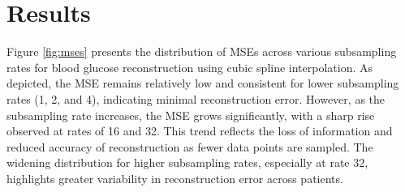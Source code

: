 
\section{Results}
Figure \ref{fig:mses} presents the distribution of MSEs across various subsampling rates for blood glucose reconstruction using cubic spline interpolation. As depicted, the MSE remains relatively low and consistent for lower subsampling rates (1, 2, and 4), indicating minimal reconstruction error. However, as the subsampling rate increases, the MSE grows significantly, with a sharp rise observed at rates of 16 and 32. This trend reflects the loss of information and reduced accuracy of reconstruction as fewer data points are sampled. The widening distribution for higher subsampling rates, especially at rate 32, highlights greater variability in reconstruction error across patients.

